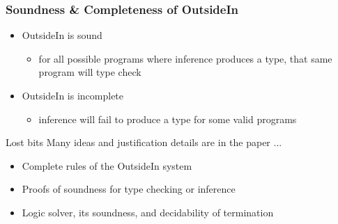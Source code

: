 \documentclass{beamer}
\begin{document}
\begin{frame}
\frametitle{Soundness \& Completeness of OutsideIn}
\begin{itemize}
   \item OutsideIn is sound
      \begin{itemize}
         \item for all possible programs where inference produces a type, that same program will type check
      \end{itemize}
   \item OutsideIn is incomplete
      \begin{itemize}
         \item inference will fail to produce a type for some valid programs
      \end{itemize}
\end{itemize}
\end{frame}


\begin{frame}{Lost bits}
Many ideas and justification details are in the paper ...
\begin{itemize}
\item Complete rules of the OutsideIn system 
\item Proofs of soundness for type checking or inference
\item Logic solver, its soundness, and decidability of termination 
\end{itemize}
\end{frame}
\end{document}
